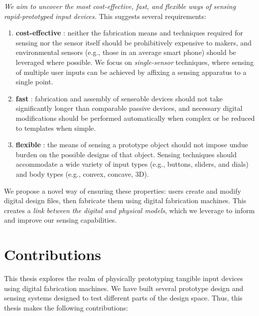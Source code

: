 \emph{We aim to uncover the most cost-effective, fast, and flexible ways of sensing rapid-prototyped input devices.} This suggests several requirements:
\begin{enumerate}
\item \textbf{cost-effective} : neither the fabrication means and techniques required for sensing nor the sensor itself should be prohibitively expensive to makers, and environmental sensors (e.g., those in an average smart phone) should be leveraged where possible. We focus on \emph{single-sensor} techniques, where sensing of multiple user inputs can be achieved by affixing a sensing apparatus to a single point. 
\item \textbf{fast} : fabrication and assembly of senseable devices should not take significantly longer than comparable passive devices, and necessary digital modifications should be performed automatically when complex or be reduced to templates when simple.
\item \textbf{flexible} : the means of sensing a prototype object should not impose undue burden on the possible designs of that object. Sensing techniques should accommodate a wide variety of input types (e.g., buttons, sliders, and dials) and body types (e.g., convex, concave, 3D).
\end{enumerate}
We propose a novel way of ensuring these properties: users create and modify digital design files, then fabricate them using digital fabrication machines. This creates a \emph{link between the digital and physical models}, which we leverage to inform and improve our sensing capabilities.

\section{Contributions}

This thesis explores the realm of physically prototyping tangible input devices using digital fabrication machines. We have built several prototype design and sensing systems designed to test different parts of the design space. Thus, this thesis makes the following contributions:


